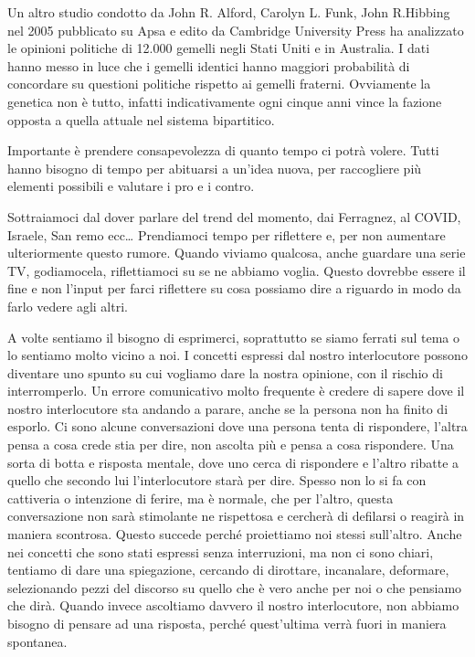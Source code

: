 \documentclass[12pt]{book} %
\begin{document}
Un altro studio condotto da John R. Alford, Carolyn L. Funk, John R.Hibbing nel 2005 pubblicato su Apsa e edito da
Cambridge University
Press ha analizzato le opinioni politiche di 12.000 gemelli negli Stati Uniti e in Australia. I dati hanno messo in luce
che i gemelli identici hanno maggiori probabilità di concordare su questioni politiche rispetto ai gemelli fraterni.
Ovviamente la genetica non è tutto, infatti indicativamente ogni cinque anni vince la fazione opposta a quella attuale
nel sistema bipartitico.

Importante è prendere consapevolezza di quanto tempo ci potrà volere. Tutti hanno bisogno di tempo per abituarsi a
un'idea nuova, per raccogliere più elementi possibili e valutare i pro e i
contro.

Sottraiamoci dal dover parlare del trend del momento, dai Ferragnez, al COVID, Israele, San remo ecc… Prendiamoci tempo per riflettere e, per non aumentare ulteriormente questo rumore. Quando viviamo qualcosa, anche guardare una serie TV, godiamocela, riflettiamoci su se ne abbiamo voglia. Questo dovrebbe essere il fine e non l'input per farci riflettere su cosa possiamo dire a riguardo in modo da farlo vedere agli altri.

A volte sentiamo il bisogno di esprimerci, soprattutto se siamo ferrati sul tema o lo sentiamo molto vicino a noi. I concetti espressi dal nostro interlocutore possono diventare uno spunto su cui vogliamo dare la nostra opinione, con il rischio di interromperlo. Un errore comunicativo molto frequente è credere di sapere dove il nostro interlocutore sta andando a
parare, anche se la persona non ha finito di esporlo. Ci sono alcune conversazioni dove una persona tenta di
rispondere, l'altra pensa a cosa crede stia per dire, non ascolta più e pensa a cosa rispondere.
Una sorta di botta e risposta mentale, dove uno cerca di rispondere e l'altro ribatte a quello che
secondo lui l'interlocutore starà per dire. Spesso non lo si fa con cattiveria o intenzione di
ferire, ma è normale, che per l'altro, questa conversazione non sarà stimolante ne rispettosa e
cercherà di defilarsi o reagirà in maniera scontrosa. Questo succede perché proiettiamo noi stessi
sull'altro. Anche nei concetti che sono stati espressi senza interruzioni, ma non ci sono chiari,
tentiamo di dare una spiegazione, cercando di dirottare, incanalare, deformare, selezionando pezzi del discorso su
quello che è vero anche per noi o che pensiamo che dirà. Quando invece ascoltiamo davvero il nostro interlocutore, non
abbiamo bisogno di pensare ad una risposta, perché quest'ultima verrà fuori in maniera spontanea.
\end{document}
